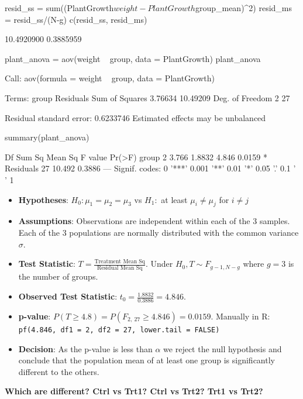 \documentclass[a4paper]{article}
\begin{document}
\begin{Schunk}
\begin{Sinput}
resid_ss = sum((PlantGrowth$weight - PlantGrowth$group_mean)^2)
resid_ms = resid_ss/(N-g)
c(resid_ss, resid_ms)
\end{Sinput}
\begin{Soutput}
[1] 10.4920900  0.3885959
\end{Soutput}
\begin{Sinput}
plant_anova = aov(weight ~ group, data = PlantGrowth)
plant_anova
\end{Sinput}
\begin{Soutput}
Call:
   aov(formula = weight ~ group, data = PlantGrowth)

Terms:
                   group Residuals
Sum of Squares   3.76634  10.49209
Deg. of Freedom        2        27

Residual standard error: 0.6233746
Estimated effects may be unbalanced
\end{Soutput}
\begin{Sinput}
summary(plant_anova)
\end{Sinput}
\begin{Soutput}
            Df Sum Sq Mean Sq F value Pr(>F)  
group        2  3.766  1.8832   4.846 0.0159 *
Residuals   27 10.492  0.3886                 
---
Signif. codes:  0 '***' 0.001 '**' 0.01 '*' 0.05 '.' 0.1 ' ' 1
\end{Soutput}
\end{Schunk}
\begin{itemize}
	\item \textbf{Hypotheses}: \( H_0: \mu_1 = \mu_2 = \mu_3 \) vs \( H_1: \) at least \( \mu_i \neq \mu_j \) for \( i \neq j \) 
	\item \textbf{Assumptions}: Observations are independent within each of the 3 samples. Each of the 3 populations are normally distributed with the common variance \( \sigma \).
	\item \textbf{Test Statistic}: \( T = \frac{\text{Treatment Mean Sq}}{\text{Residual Mean Sq}} \). Under \( H_0, T \sim F_{g-1,N-g} \) where \( g = 3 \) is the number of groups.
	\item \textbf{Observed Test Statistic}: \( t_0 = \frac{1.8832}{0.3886} = 4.846 \).
	\item \textbf{p-value}: \( P(T \geq 4.8) = P(F_{2,\ 27} \geq 4.846) = 0.0159 \). Manually in R: \lstinline|pf(4.846, df1 = 2, df2 = 27, lower.tail = FALSE)|
	\item \textbf{Decision}: As the p-value is less than \( \alpha \) we reject the null hypothesis and conclude that the population mean of at least one group is significantly different to the others.
\end{itemize}
\begin{greenbox}
	\textbf{Which are different? Ctrl vs Trt1? Ctrl vs Trt2? Trt1 vs Trt2?}
\end{greenbox}
\end{document}
